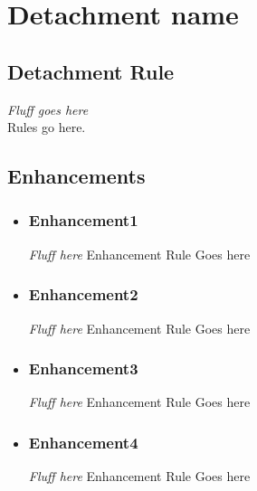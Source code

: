 \documentclass{report}
\begin{document}
\chapter{Detachment name}

\begin{multicols}{2}
\begin{minipage}[t][7cm][b]{\textwidth}
\section{Detachment Rule}\label{sec:rule}%
\textit{Fluff goes here}\\
Rules go here.\\
\section{Enhancements}
\begin{itemize}
\item \subsection{Enhancement1}
\textit{Fluff here}
Enhancement Rule Goes here
\item \subsection{Enhancement2}
\textit{Fluff here}
Enhancement Rule Goes here
\item \subsection{Enhancement3}
\textit{Fluff here}
Enhancement Rule Goes here
\item \subsection{Enhancement4}
\textit{Fluff here}
Enhancement Rule Goes here
\end{itemize}
\end{minipage}
\newpage
\begin{minipage}[t][20cm][t]{\textwidth}

\end{minipage}
\end{multicols}
\end{document}
